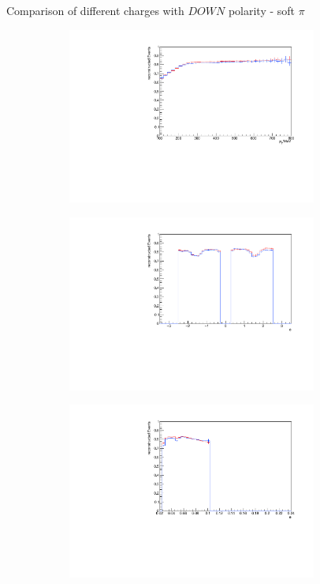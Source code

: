 \documentclass[11pt]{beamer}
\begin{document}
\begin{frame}{Comparison of different charges with $DOWN$ polarity - soft $\pi$}
\begin{figure}
\begin{subfigure}{0.45\textwidth}
\includegraphics[width=0.9\textwidth]{sec/down_pdf/combined/h_pt_reco_SPi.pdf}
\end{subfigure}
\begin{subfigure}{0.45\textwidth}
\includegraphics[width=0.9\textwidth]{sec/down_pdf/combined/h_phi_reco_SPi.pdf}
\end{subfigure}
\begin{subfigure}{0.45\textwidth}
\includegraphics[width=0.9\textwidth]{sec/down_pdf/combined/h_theta_reco_SPi.pdf}

\end{subfigure}
\end{figure}
\end{frame}
\end{document}
